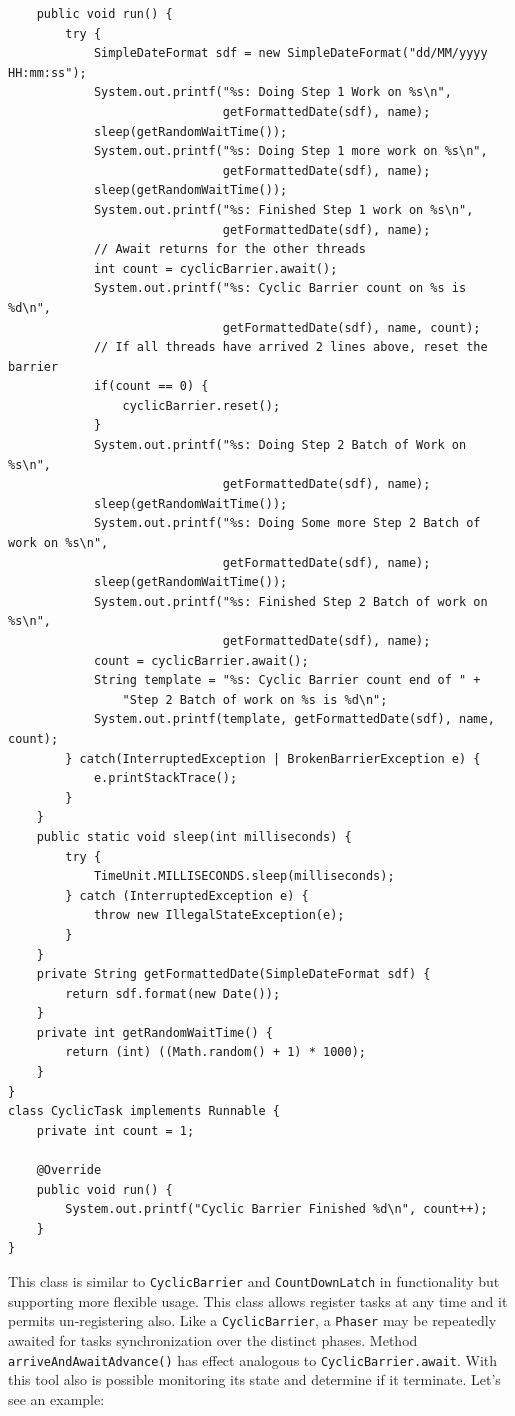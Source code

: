 \documentclass{latex/classes/thesis}
\begin{document}
\begin{description}
\begin{lstlisting}
    public void run() {
        try {
            SimpleDateFormat sdf = new SimpleDateFormat("dd/MM/yyyy HH:mm:ss");
            System.out.printf("%s: Doing Step 1 Work on %s\n",
                              getFormattedDate(sdf), name);
            sleep(getRandomWaitTime());
            System.out.printf("%s: Doing Step 1 more work on %s\n",
                              getFormattedDate(sdf), name);
            sleep(getRandomWaitTime());
            System.out.printf("%s: Finished Step 1 work on %s\n",
                              getFormattedDate(sdf), name);
            // Await returns for the other threads
            int count = cyclicBarrier.await();
            System.out.printf("%s: Cyclic Barrier count on %s is %d\n",
                              getFormattedDate(sdf), name, count);
            // If all threads have arrived 2 lines above, reset the barrier
            if(count == 0) {
                cyclicBarrier.reset();
            }
            System.out.printf("%s: Doing Step 2 Batch of Work on %s\n",
                              getFormattedDate(sdf), name);
            sleep(getRandomWaitTime());
            System.out.printf("%s: Doing Some more Step 2 Batch of work on %s\n",
                              getFormattedDate(sdf), name);
            sleep(getRandomWaitTime());
            System.out.printf("%s: Finished Step 2 Batch of work on %s\n",
                              getFormattedDate(sdf), name);
            count = cyclicBarrier.await();
            String template = "%s: Cyclic Barrier count end of " +
                "Step 2 Batch of work on %s is %d\n";
            System.out.printf(template, getFormattedDate(sdf), name, count);
        } catch(InterruptedException | BrokenBarrierException e) {
            e.printStackTrace();
        }
    }
    public static void sleep(int milliseconds) {
        try {
            TimeUnit.MILLISECONDS.sleep(milliseconds);
        } catch (InterruptedException e) {
            throw new IllegalStateException(e);
        }
    }
    private String getFormattedDate(SimpleDateFormat sdf) {
        return sdf.format(new Date());
    }
    private int getRandomWaitTime() {
        return (int) ((Math.random() + 1) * 1000);
    }
}
class CyclicTask implements Runnable {
    private int count = 1;

    @Override
    public void run() {
        System.out.printf("Cyclic Barrier Finished %d\n", count++);
    }
}
\end{lstlisting}

\item[{Phaser}] This class is similar to \texttt{CyclicBarrier} and \texttt{CountDownLatch} in
functionality but supporting more flexible usage. This class allows
register tasks at any time and it permits un-registering also. Like a
\texttt{CyclicBarrier}, a \texttt{Phaser} may be repeatedly awaited for tasks synchronization
over the distinct phases. Method \texttt{arriveAndAwaitAdvance()} has effect
analogous to \texttt{CyclicBarrier.await}. With this tool also is possible
monitoring its state and determine if it terminate. Let's see an example:
\end{description}
\end{document}
